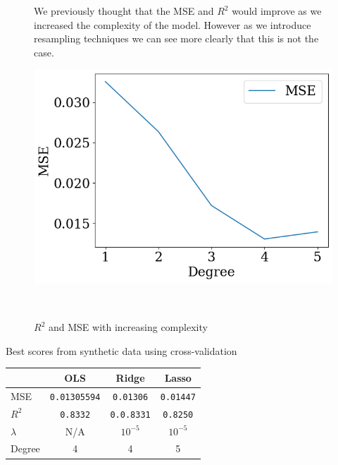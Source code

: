 \documentclass[twoside,11pt]{report}
\begin{document}
\begin{figure}[h]
\begin{minipage}[!t]{.48\linewidth}
    We previously thought that the MSE and $R^2$ would improve as we increased the complexity of the model. However
as we introduce resampling techniques we can see more clearly that this is not the case. 
\end{minipage}
\hspace{4mm}
\begin{minipage}[!t]{.48\linewidth}
    \begin{center}
        \includegraphics[width=1.0\textwidth]{../runsAndAdditions/R2andMSEOLSCrossval.png}
        \caption{$R^2$ and MSE with increasing complexity}\label{fig:R2andMSEOLSCrossval}
    \end{center}
\end{minipage}\\
\end{figure}

\begin{mytable}[float=!h,label=tab:toyscoresCrossval, width=0.7\textwidth]{Best scores from synthetic data using cross-validation}
\centering
\begin{tabular}{l|c|c|c}
    & OLS & Ridge & Lasso \\
    \hline
    MSE  &   \texttt{0.01305594} & \texttt{0.01306} & \texttt{0.01447} \\
    $R^2$     &   \texttt{0.8332} & \texttt{0.0.8331} & \texttt{0.8250} \\
    $\lambda$ &  N/A  & $10^{-5}$ & $10^{-5}$ \\
    Degree & 4 & 4 & 5
\end{tabular}%
\end{mytable}
\end{document}
